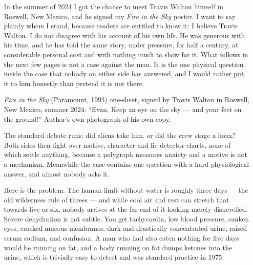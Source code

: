 \begin{funfact}
In the summer of 2024 I got the chance to meet Travis Walton himself in Roswell, New Mexico, and
he signed my \emph{Fire in the Sky} poster. I want to say plainly where I stand, because readers
are entitled to know it: I believe Travis Walton. I do not disagree with his account of his own
life. He was generous with his time, and he has told the same story, under pressure, for half a
century, at considerable personal cost and with nothing much to show for it. What follows in the
next few pages is not a case against the man. It is the one physical question inside the case
that nobody on either side has answered, and I would rather put it to him honestly than pretend
it is not there.\par
\vspace{7pt}
\begin{center}
\par\vspace{4pt}
\begin{minipage}{0.86\linewidth}
{\RaggedRight\scriptsize\color{steel} \emph{Fire in the Sky} (Paramount, 1993) one-sheet, signed
by Travis Walton in Roswell, New Mexico, summer 2024: ``Evan, Keep an eye on the sky --- and your
feet on the ground!'' Author's own photograph of his own copy.\par}
\end{minipage}
\end{center}
\end{funfact}

The standard debate runs: did aliens take him, or did the crew stage a hoax? Both sides then
fight over motive, character and lie-detector charts, none of which settle anything, because a
polygraph measures anxiety and a motive is not a mechanism. Meanwhile the case contains one
question with a hard physiological answer, and almost nobody asks it.


Here is the problem.  The human
limit without water is roughly three days --- the old wilderness rule of threes --- and while
cool air and rest can stretch that towards five or six, nobody arrives at the far end of it
looking merely dishevelled. Severe dehydration is not subtle. You get tachycardia, low blood
pressure, sunken eyes, cracked mucous membranes, dark and drastically concentrated urine,
raised serum sodium, and confusion. A man who had also eaten nothing for five days would be
running on fat, and a body running on fat dumps ketones into the urine, which is trivially easy
to detect and was standard practice in 1975.

